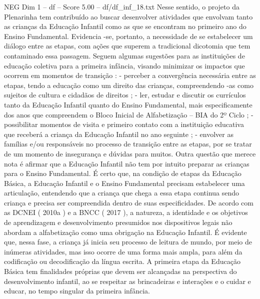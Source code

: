 \begin{textsample}{NEG Dim 1 – df – Score 5.00 – df/df\_inf\_18.txt}
Nesse sentido, o projeto da Plenarinha tem contribuído ao buscar desenvolver atividades que envolvam tanto as crianças da Educação Infantil como as que se encontram no primeiro ano do Ensino Fundamental.
Evidencia -se, portanto, a necessidade de se estabelecer um diálogo entre as etapas, com ações que superem a tradicional dicotomia que tem contaminado essa passagem.
Seguem algumas sugestões para as instituições de educação coletiva para a primeira infância, visando minimizar os impactos que ocorrem em momentos de transição : - perceber a convergência necessária entre as etapas, tendo a educação como um direito das crianças, compreendendo -as como sujeitos de cultura e cidadãos de direitos ; - ler, estudar e discutir os currículos tanto da Educação Infantil quanto do Ensino Fundamental, mais especificamente dos anos que compreendem o Bloco Inicial de Alfabetização – BIA do 2º Ciclo ; - possibilitar momentos de visita e primeiro contato com a instituição educativa que receberá a criança da Educação Infantil no ano seguinte ; - envolver as famílias e/ou responsáveis no processo de transição entre as etapas, por se tratar de um momento de insegurança e dúvidas para muitos.
Outra questão que merece nota é afirmar que a Educação Infantil não tem por intuito preparar as crianças para o Ensino Fundamental.
É certo que, na condição de etapas da Educação Básica, a Educação Infantil e o Ensino Fundamental precisam estabelecer uma articulação, entendendo que a criança que chega a essa etapa continua sendo criança e precisa ser compreendida dentro de suas especificidades.
De acordo com as DCNEI ( 2010a ) e a BNCC ( 2017 ), a natureza, a identidade e os objetivos de aprendizagem e desenvolvimento presumidos nos dispositivos legais não abordam a alfabetização como uma obrigação na Educação Infantil.
É evidente que, nessa fase, a criança já inicia seu processo de leitura de mundo, por meio de inúmeras atividades, mas isso ocorre de uma forma mais ampla, para além da codificação ou decodificação da língua escrita.
A primeira etapa da Educação Básica tem finalidades próprias que devem ser alcançadas na perspectiva do desenvolvimento infantil, ao se respeitar as brincadeiras e interações e o cuidar e educar, no tempo singular da primeira infância.

\end{textsample}
